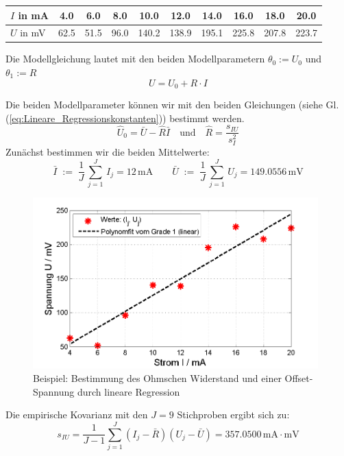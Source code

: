 \begin{center}
	\begin{tabular}{l||c|c|c|c|c|c|c|c|c}
			\hline\hline
			$I$ in mA &    4.0 &     6.0 &     8.0 &    10.0 &    12.0 &    14.0 &    16.0 &    18.0 &    20.0\\
			\hline
			$U$ in mV &    62.5 &    51.5 &    96.0 &   140.2 &   138.9 &   195.1 &   225.8 &   207.8 &   223.7 \\
			\hline\hline
	\end{tabular}
\end{center}

Die Modellgleichung lautet mit den beiden Modellparametern 
$\theta_0 :=U_0$ und $\theta_1:=R$ 
\begin{equation}
U = U_0 + R \cdot I
\end{equation}

Die beiden Modellparameter können wir mit den beiden Gleichungen (siehe Gl. (\ref{eq:Lineare_Regressionskonstanten})) bestimmt werden.
\begin{equation}
\hat{U}_0 = \bar {U} - \hat{R} \bar {I} \quad \mathrm{und} \quad
\hat{R} = \frac{s_{IU} }{s_I^2 }
\label{eq:Lineare_Regressionskonstanten_Widerstand}
\end{equation}
Zunächst bestimmen wir die beiden Mittelwerte:
\begin{equation}
\bar{I}\; := \; \frac{1}{J} \, \sum\limits_{j = 1}^J \, I_j
= 12 \, \mathrm{mA}
\qquad 
\bar{U} \; := \; \frac{1}{J} \, \sum\limits_{j = 1}^J \, U_j
= 149.0556  \, \mathrm{mV}
\end{equation}
\begin{figure}
	\centering
	\includegraphics[width=11cm]{02_vorlesung/media/Regression_der_WertePaare_Strom_Spannung.png}
	\caption{Beispiel: Bestimmung des Ohmschen Widerstand und einer Offset-Spannung durch lineare Regression} \label{fig:LineareRegressionWiderstand}
\end{figure}
Die empirische Kovarianz mit den $J = 9$ Stichproben ergibt sich zu: 
\[
s_{IU} = \frac{1}{J - 1}\sum\limits_{j = 1}^J 
(I_j - \bar {R})(U_j - \bar {U}) = 357.0500  \, \mathrm{mA} \cdot \mathrm{mV}
\]

